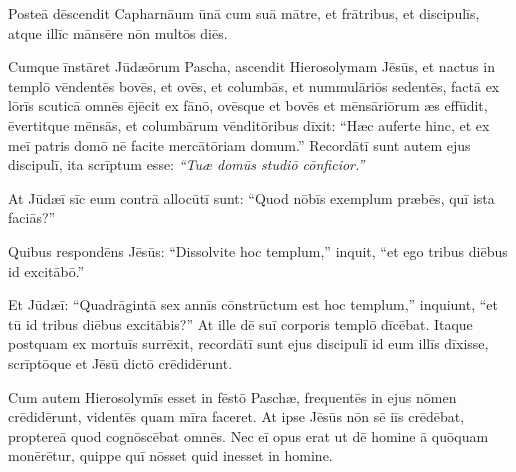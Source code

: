 \Versus Posteā dēscendit Capharnāum ūnā cum suā mātre, et frātribus, et discipulīs, atque illīc mānsēre nōn multōs diēs.

\Versus Cumque īnstāret Jūdæōrum Pascha, ascendit Hierosolymam Jēsūs,
\Versus et nactus in templō vēndentēs bovēs, et ovēs, et columbās, et nummulāriōs sedentēs,
\Versus factā ex lōrīs scuticā omnēs ējēcit ex fānō, ovēsque et bovēs et mēnsāriōrum æs effūdit, ēvertitque mēnsās,
\Versus et columbārum vēnditōribus dīxit: ``Hæc auferte hinc, et ex meī patris domō nē facite mercātōriam domum.''
\Versus Recordātī sunt autem ejus discipulī, ita scrīptum esse: \emph{``Tuæ domūs studiō cōnficior.''}

\Versus At Jūdæī sīc eum contrā allocūtī sunt: ``Quod nōbīs exemplum præbēs, quī ista faciās?''

\Versus Quibus respondēns Jēsūs: ``Dissolvite hoc templum,'' inquit, ``et ego tribus diēbus id excitābō.''

\Versus Et Jūdæī: ``Quadrāgintā sex annīs cōnstrūctum est hoc templum,'' inquiunt, ``et tū id tribus diēbus excitābis?''
\Versus At ille dē suī corporis templō dīcēbat.
\Versus Itaque postquam ex mortuīs surrēxit, recordātī sunt ejus discipulī id eum illīs dīxisse, scrīptōque et Jēsū dictō crēdidērunt.

\Versus Cum autem Hierosolymīs esset in fēstō Paschæ, frequentēs in ejus nōmen crēdidērunt, videntēs quam mīra faceret.
\Versus At ipse Jēsūs nōn sē iīs crēdēbat, proptereā quod cognōscēbat omnēs.
\Versus Nec eī opus erat ut dē homine ā quōquam monērētur, quippe quī nōsset quid inesset in homine.
